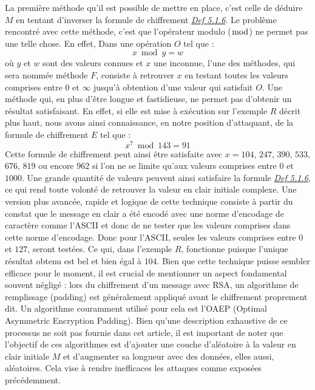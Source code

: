 \documentclass{article}
\begin{document}
La première méthode qu'il est possible de mettre en place, c'est celle
de déduire \(M\) en tentant d'inverser la formule de chiffrement
\textit{\hyperref[def-5.1.6]{Def 5.1.6}}. Le problème rencontré avec
cette méthode, c'est que l'opérateur modulo (\(\bmod\)) ne permet pas
une telle chose. En effet, Dans une opération \(O\) tel que
:\[x \bmod y = w\]où \(y\) et \(w\) sont des valeurs connues et \(x\)
une inconnue, l'une des méthodes, qui sera nommée méthode \(F\),
consiste à retrouver \(x\) en testant toutes les valeurs comprises entre
\(0\) et \(\infty\) jusqu'à obtention d'une valeur qui satisfait \(O\).
Une méthode qui, en plus d'être longue et fastidieuse, ne permet pas
d'obtenir un résultat satisfaisant. En effet, si elle est mise à
exécution sur l'exemple \(R\) décrit plus haut, nous avons ainsi
connaissance, en notre position d'attaquant, de la formule de
chiffrement \(E\) tel que : \[x^7 \bmod 143 = 91\]Cette formule de
chiffrement peut ainsi être satisfaite avec \(x=104\), \(247\), \(390\),
\(533\), \(676\), \(819\) ou encore \(962\) si l'on ne se limite qu'aux
valeurs comprises entre \(0\) et \(1000\). Une grande quantité de
valeurs peuvent ainsi satisfaire la formule
\textit{\hyperref[def-5.1.6]{Def 5.1.6}}, ce qui rend toute volonté
de retrouver la valeur en clair initiale complexe. Une version plus
avancée, rapide et logique de cette technique consiste à partir du
constat que le message en clair a été encodé avec une norme d'encodage
de caractère comme l'ASCII et donc de ne tester que les valeurs
comprises dans cette norme d'encodage. Donc pour l'ASCII, seules les
valeurs comprises entre \(0\) et \(127\), seront testées. Ce qui, dans
l'exemple \(R\), fonctionne puisque l'unique résultat obtenu est bel et
bien égal à \(104\). Bien que cette technique puisse sembler efficace
pour le moment, il est crucial de mentionner un aspect fondamental
souvent négligé : lors du chiffrement d'un message avec RSA, un
algorithme de remplissage (padding) est généralement appliqué avant le
chiffrement proprement dit. Un algorithme couramment utilisé pour cela
est l'OAEP (Optimal Asymmetric Encryption Padding). Bien qu'une
description exhaustive de ce processus ne soit pas fournie dans cet
article, il est important de noter que l'objectif de ces algorithmes est
d'ajouter une couche d'aléatoire à la valeur en clair initiale \(M\) et
d'augmenter sa longueur avec des données, elles aussi, aléatoires. Cela
vise à rendre inefficaces les attaques comme exposées précédemment.

\clearpage
\end{document}
